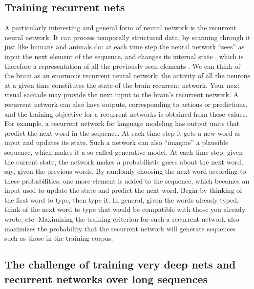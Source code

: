 \documentclass[11pt]{article} %
\begin{document}
\subsection{Training recurrent nets}

A particularly interesting and general form of neural network is the
recurrent neural network. It can process temporally structured data, by
scanning through it just like humans and animals do: at each time step the
neural network “sees” as input the next element of the sequence, and
changes its internal state , which is therefore a representation of all the
previously seen elements . We can think of the brain as an enormous
recurrent neural network: the activity of all the neurons at a given time
constitutes the state of the brain recurrent network. Your next visual
saccade may provide the next input to the brain’s recurrent network. A
recurrent network can also have outputs, corresponding to actions or
predictions, and the training objective for a recurrent networks is
obtained from these values. For example, a recurrent network for language
modeling has output units that predict the next word in the sequence. At
each time step it gets a new word as input and updates its state. Such a
network can also “imagine” a plausible sequence, which makes it a so-called
generative model.  At each time step, given the current state, the network
makes a probabilistic guess about the next word, say, given the previous
words. By randomly choosing the next word according to these probabilities,
one more element is added to the sequence, which becomes an input used to
update the state and predict the next word. Begin by thinking of the first
word to type, then type it. In general, given the words already typed,
think of the next word to type that would be compatible with those you
already wrote, etc. Maximizing the training criterion for such a recurrent
network also maximizes the probability that the recurrent network will
generate sequences such as those in the training corpus.


\subsection{The challenge of training very deep nets and recurrent networks over long sequences}
\end{document}
